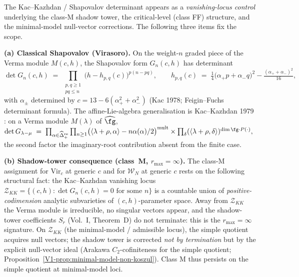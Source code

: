 \begin{remark}
\label{rem:shapovalov-determinant-scope}
%
The Kac--Kazhdan / Shapovalov determinant appears as a
\emph{vanishing-locus control} underlying the class-M shadow tower,
the critical-level (class FF) structure, and the minimal-model
null-vector corrections. The following three items fix the scope.

\smallskip
\textbf{(a) Classical Shapovalov (Virasoro).} On the weight-$n$ graded piece
of the Verma module $M(c,h)$, the Shapovalov form $G_n(c,h)$ has determinant
\[
\det G_n(c,h) \;=\; \prod_{\substack{p,q\ge 1\\ pq\le n}}
 \bigl(h - h_{p,q}(c)\bigr)^{p(n-pq)},
\qquad
h_{p,q}(c) \;=\; \tfrac{1}{4}\bigl(\alpha_+ p + \alpha_- q\bigr)^2 - \tfrac{(\alpha_+ + \alpha_-)^2}{16},
\]
with $\alpha_\pm$ determined by $c = 13 - 6(\alpha_+^2 + \alpha_-^2)$
(Kac 1978; Feigin--Fuchs determinant formula).
The affine-Lie-algebra generalisation is Kac--Kazhdan 1979
\cite{KacKazhdan79}: on a Verma module $M(\lambda)$ of $\widehat\fg$,
\(
\det G_{\lambda - \mu} \;=\;
\prod_{\alpha \in \widehat\Delta_+^{\mathrm{re}}}\prod_{n\ge 1}
 \bigl(\langle \lambda+\rho, \alpha\rangle - n\alpha(\alpha)/2\bigr)^{\mathrm{mult}}
\times
\prod_{\delta}(\langle\lambda+\rho,\delta\rangle)^{\dim \fg \cdot P(\cdot)},
\)
the second factor the imaginary-root contribution absent from the finite case.

\smallskip
\textbf{(b) Shadow-tower consequence (class~M, $r_{\max}=\infty$).}
The class-M assignment for Vir$_c$ at generic $c$ and for
$\mathcal W_N$ at generic $c$ rests on the following structural fact:
the Kac--Kazhdan vanishing locus
$\mathcal Z_{KK} = \{(c,h) : \det G_n(c,h) = 0\text{ for some }n\}$
is a countable union of \emph{positive-codimension} analytic subvarieties
of $(c,h)$-parameter space. Away from $\mathcal Z_{KK}$ the Verma module
is irreducible, no singular vectors appear, and the shadow-tower
coefficients $S_r$ (Vol.~I, Theorem~D) do not terminate: this is the
$r_{\max}=\infty$ signature. On $\mathcal Z_{KK}$ (the minimal-model / admissible
locus), the simple quotient acquires null vectors; the shadow tower is
corrected \emph{not by termination} but by the explicit null-vector ideal
(Arakawa $C_2$-cofiniteness for the simple quotient;
Proposition~\ref*{V1-prop:minimal-model-non-koszul}).
Class M thus persists on the simple quotient at minimal-model loci.


\end{remark}
